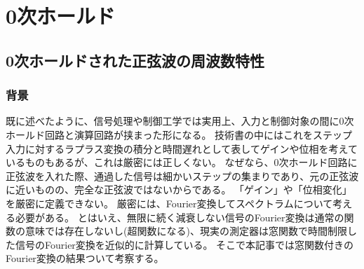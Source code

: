 \chapter{0次ホールド}
    \section{0次ホールドされた正弦波の周波数特性}
        \label{0次ホールドされた正弦波の周波数特性}
        \subsection{背景}
            既に述べたように、信号処理や制御工学では実用上、入力と制御対象の間に0次ホールド回路と演算回路が挟まった形になる。
            技術書の中にはこれをステップ入力に対するラプラス変換の積分と時間遅れとして表してゲインや位相を考えているものもあるが、これは厳密には正しくない。
            なぜなら、0次ホールド回路に正弦波を入れた際、通過した信号は細かいステップの集まりであり、元の正弦波に近いものの、完全な正弦波ではないからである。
            「ゲイン」や「位相変化」を厳密に定義できない。
            厳密には、Fourier変換してスペクトラムについて考える必要がある。
            とはいえ、無限に続く減衰しない信号のFourier変換は通常の関数の意味では存在しないし(超関数になる)、現実の測定器は窓関数で時間制限した信号のFourier変換を近似的に計算している。
            そこで本記事では窓関数付きのFourier変換の結果ついて考察する。
